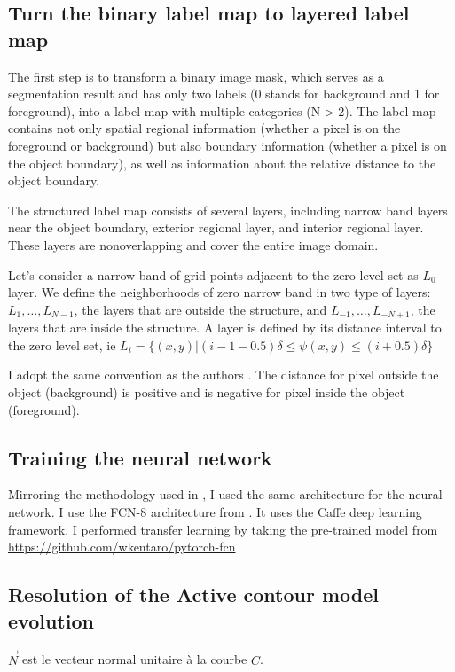 \documentclass[a4paper, 11pt]{article}
\begin{document}
\subsection{Turn the binary label map to layered label map}
The first step is to transform a binary image mask, which serves as a segmentation result and has only two labels (0 stands for background and 1 for foreground), into a label map with multiple categories (N > 2). The label map contains not only spatial regional information (whether a pixel is on the foreground or background) but also boundary information (whether a pixel is on the object boundary), as well as information about the relative distance to the object boundary.

The structured label map consists of several layers, including narrow band layers near the object boundary, exterior regional layer, and interior regional layer. These layers are nonoverlapping and cover the entire image domain.

Let's consider a narrow band of grid points adjacent to the zero level set as $L_0$ layer. We define the neighborhoods of zero narrow band in two type of layers: $L_1, \dots, L_{N-1}$, the layers that are outside the structure, and $L_{-1}, \dots, L_{-N+1}$, the layers that are inside the structure. A layer is defined by its distance interval to the zero level set, ie 
$L_i = \lbrace (x, y) | (i-1 - 0.5)\delta \leq \psi(x, y) \leq (i + 0.5) \delta \rbrace$


I adopt the same convention as the authors \cite{guo_automatic_2019}. The distance for pixel outside the object (background) is positive and is negative for pixel inside the object (foreground). 


\subsection{Training the neural network}

Mirroring the methodology used in \cite{guo_automatic_2019}, I used the same architecture for the neural network. I use the FCN-8 architecture from \cite{long_fully_2015}. It uses the Caffe deep learning framework. I performed transfer learning by taking the pre-trained model from \url{https://github.com/wkentaro/pytorch-fcn}

\subsection{Resolution of the Active contour model evolution}
$\overrightarrow{N}$ est le vecteur normal unitaire à la courbe $C$.
\end{document}
